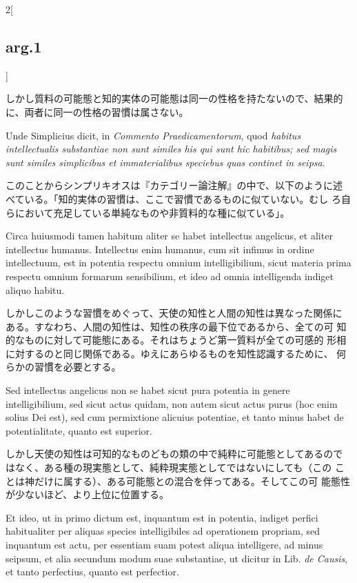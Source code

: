 \documentclass[paper=a4paper,fontsize=10pt,jafontsize=9pt,titlepage]{jlreq}
\begin{document}
\begin{paracol}{2}[\subsection{arg.1}]
\switchcolumn

しかし質料の可能態と知的実体の可能態は同一の性格を持たないので、結果的
 に、両者に同一の性格の習慣は属さない。

\switchcolumn*

Unde Simplicius dicit, in {\itshape Commento Praedicamentorum}, quod
 {\itshape habitus intellectualis substantiae non sunt similes his qui
 sunt hic habitibus; sed magis sunt similes simplicibus et
 immaterialibus speciebus quas continet in seipsa}.

\switchcolumn

このことからシンプリキオスは『カテゴリー論注解』の中で、以下のように述
 べている。「知的実体の習慣は、ここで習慣であるものに似ていない。むし
 ろ自らにおいて充足している単純なものや非質料的な種に似ている」。

\switchcolumn*

Circa huiusmodi tamen habitum aliter se habet intellectus angelicus,
et aliter intellectus humanus. Intellectus enim humanus, cum sit
infimus in ordine intellectuum, est in potentia respectu omnium
intelligibilium, sicut materia prima respectu omnium formarum
sensibilium, et ideo ad omnia intelligenda indiget aliquo habitu.

\switchcolumn

しかしこのような習慣をめぐって、天使の知性と人間の知性は異なった関係に
 ある。すなわち、人間の知性は、知性の秩序の最下位であるから、全ての可
 知的なものに対して可能態にある。それはちょうど第一質料が全ての可感的
 形相に対するのと同じ関係である。ゆえにあらゆるものを知性認識するために、
 何らかの習慣を必要とする。

\switchcolumn*

Sed intellectus angelicus non se habet sicut pura potentia in genere
intelligibilium, sed sicut actus quidam, non autem sicut actus purus
(hoc enim solius Dei est), sed cum permixtione alicuius potentiae, et
tanto minus habet de potentialitate, quanto est superior.

\switchcolumn

しかし天使の知性は可知的なものどもの類の中で純粋に可能態としてあるので
 はなく、ある種の現実態として、純粋現実態としてではないにしても（この
 ことは神だけに属する）、ある可能態との混合を伴ってある。そしてこの可
 能態性が少ないほど、より上位に位置する。

\switchcolumn*

Et ideo, ut in primo dictum est, inquantum est in potentia, indiget
perfici habitualiter per aliquas species intelligibiles ad operationem
propriam, sed inquantum est actu, per essentiam suam potest aliqua
intelligere, ad minus seipsum, et alia secundum modum suae
substantiae, ut dicitur in Lib. {\itshape de Causis}, et tanto perfectius, quanto
est perfectior.


\end{paracol}
\end{document}
